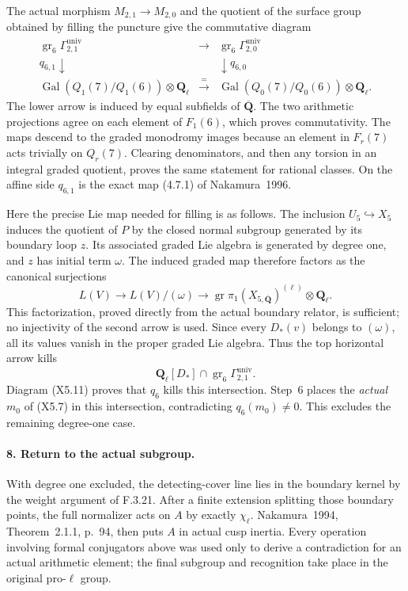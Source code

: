The actual morphism $M_{2,1}\to M_{2,0}$ and the quotient
of the surface group obtained by filling the puncture
give the commutative diagram
\[
\begin{array}{ccc}
 \operatorname{gr}_6\Gamma^{\mathrm{univ}}_{2,1}
 &\longrightarrow&
 \operatorname{gr}_6\Gamma^{\mathrm{univ}}_{2,0}\\
 q_{6,1}\downarrow&&\downarrow q_{6,0}\\
 \operatorname{Gal}(Q_1(7)/Q_1(6))\otimes\mathbf Q_\ell
 &\xrightarrow{\ =\ }&
 \operatorname{Gal}(Q_0(7)/Q_0(6))\otimes\mathbf Q_\ell.
\end{array}
\tag{X5.11}
\]
The lower arrow is induced by equal subfields of
$\overline{\mathbf Q}$. The two arithmetic projections
agree on each element of $F_1(6)$, which proves
commutativity. The maps descend to the graded monodromy
images because an element in $F_r(7)$ acts trivially on
$Q_r(7)$. Clearing denominators, and then any torsion in
an integral graded quotient, proves the same statement
for rational classes. On the affine side $q_{6,1}$ is
the exact map (4.7.1) of Nakamura~1996.

Here the precise Lie map needed for filling is as follows.
The inclusion $U_5\hookrightarrow X_5$ induces the quotient
of $P$ by the closed normal subgroup generated by its
boundary loop $z$. Its associated graded Lie algebra is
generated by degree one, and $z$ has initial term
$\omega$. The induced graded map therefore factors as
the canonical surjections
\[
 L(V)\longrightarrow L(V)/(\omega)
       \longrightarrow
 \operatorname{gr}\pi_1(X_{5,\overline{\mathbf Q}})^{(\ell)}
       \otimes\mathbf Q_\ell.
\]
This factorization, proved directly from the actual
boundary relator, is sufficient; no injectivity of the
second arrow is used. Since every $D_*(v)$ belongs to
$(\omega)$, all its values vanish in the proper graded
Lie algebra. Thus the top horizontal arrow kills
\[
 \mathbf Q_\ell[D_*]\cap
     \operatorname{gr}_6\Gamma^{\mathrm{univ}}_{2,1}.
\]
Diagram (X5.11) proves that $q_6$ kills this intersection.
Step~6 places the \emph{actual} $m_0$ of (X5.7) in this
intersection, contradicting $q_6(m_0)\ne0$.
This excludes the remaining degree-one case.

\paragraph{8. Return to the actual subgroup.}
With degree one excluded, the detecting-cover line lies
in the boundary kernel by the weight argument of F.3.21.
After a finite extension splitting those boundary points,
the full normalizer acts on $A$ by exactly $\chi_\ell$.
Nakamura~1994, Theorem~2.1.1, p.~94, then puts $A$ in
actual cusp inertia. Every operation involving formal
conjugators above was used only to derive a contradiction
for an actual arithmetic element; the final subgroup and
recognition take place in the original pro-$\ell$ group.

